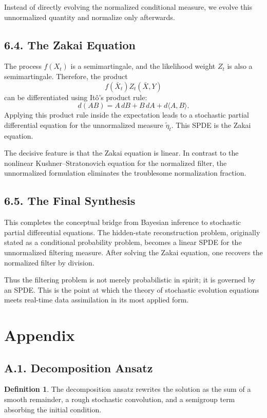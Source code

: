 \documentclass[11pt]{article}
\theoremstyle{definition}
\newtheorem{definition}{Definition}
\theoremstyle{remark}
\begin{document}
Instead of directly evolving the normalized conditional measure, we evolve this unnormalized quantity and normalize only afterwards.

\subsection*{6.4. The Zakai Equation}
The process \(f(X_t)\) is a semimartingale, and the likelihood weight \(Z_t\) is also a semimartingale. Therefore, the product
\[
f(\bar X_t)Z_t(\bar X,Y)
\]
can be differentiated using It\^o's product rule:
\[
d(AB)=A\,dB+B\,dA+d\langle A,B\rangle.
\]
Applying this product rule inside the expectation leads to a stochastic partial differential equation for the unnormalized measure \(\widetilde\eta_t\). This SPDE is the Zakai equation.

The decisive feature is that the Zakai equation is linear. In contrast to the nonlinear Kushner--Stratonovich equation for the normalized filter, the unnormalized formulation eliminates the troublesome normalization fraction.

\subsection*{6.5. The Final Synthesis}
This completes the conceptual bridge from Bayesian inference to stochastic partial differential equations. The hidden-state reconstruction problem, originally stated as a conditional probability problem, becomes a linear SPDE for the unnormalized filtering measure. After solving the Zakai equation, one recovers the normalized filter by division.

Thus the filtering problem is not merely probabilistic in spirit; it is governed by an SPDE. This is the point at which the theory of stochastic evolution equations meets real-time data assimilation in its most applied form.

\section*{Appendix}

\subsection*{A.1. Decomposition Ansatz}
\begin{definition}
The decomposition ansatz rewrites the solution as the sum of a smooth remainder, a rough stochastic convolution, and a semigroup term absorbing the initial condition.
\end{definition}
\end{document}
